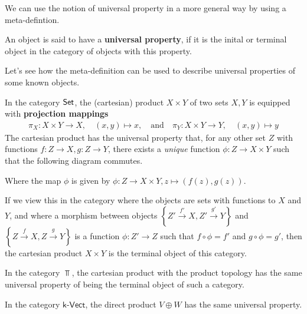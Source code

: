 We can use the notion of universal property in a more general way by using a meta-defintion.
\begin{dfn}[]
  An object is said to have a \textbf{universal property}, if it is the inital or terminal object in the category of objects with this property.
\end{dfn}

Let's see how the meta-definition can be used to describe universal properties of some known objects.
\begin{ex}[Product]
  In the category $\text{\sffamily Set}$, the (cartesian) product $X \times Y$ of two sets $X,Y$ is equipped with \textbf{projection mappings}
  \begin{align*}
    \pi_X: X \times Y \to X, \quad (x,y) \mapsto x, 
    \quad \text{and} \quad
    \pi_Y: X \times Y \to Y, \quad (x,y) \mapsto y
  \end{align*}
  The cartesian product has the universal property that, for any other set $Z$ with functions $f: Z \to X, g: Z \to Y$, there exists a \emph{unique} function $\phi:Z \to X \times Y$ such that the following diagram commutes.
  \begin{center}
  \end{center}
  Where the map $\phi$ is given by $\phi: Z \to X \times Y, z \mapsto (f(z),g(z))$.
  
  If we view this in the category where the objects are sets with functions to $X$ and $Y$, and where a morphism between objects 
  $\left\{Z' \stackrel{f'}{\to}X, Z' \stackrel{g'}{\to}Y\right\}$
  and
  $\left\{Z \stackrel{f}{\to}X, Z \stackrel{g}{\to}Y\right\}$
  is a function $\phi: Z'  \to Z$ such that $f \circ \phi = f'$ and $g \circ \phi = g'$, 
  then the cartesian product $X \times Y$ is the terminal object of this category.

 In the category $\Top$, the cartesian product with the product topology has the same universal property of being the terminal object of such a category.

 In the category $\textsf{k-Vect}$, the direct product $V \oplus W$ has the same universal property.
\end{ex}
